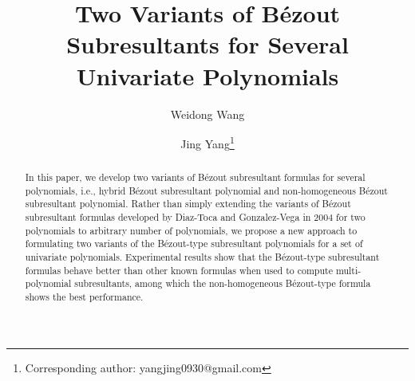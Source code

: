 \documentclass{article}
\begin{document}
\title{Two Variants of B\'ezout Subresultants for Several Univariate Polynomials }
\author{Weidong Wang}
\author{Jing Yang\thanks{Corresponding author: yangjing0930@gmail.com}}%



\date{}

\maketitle
\begin{abstract}In this paper, we develop two variants of B\'ezout subresultant formulas for several polynomials, i.e., hybrid B\'ezout subresultant polynomial and non-homogeneous B\'ezout subresultant polynomial. Rather than simply extending the variants of B\'ezout subresultant formulas developed by Diaz-Toca and Gonzalez-Vega in 2004 for two polynomials to arbitrary number of polynomials, we propose a new approach to formulating two variants of the B\'ezout-type subresultant polynomials for a set of univariate polynomials. Experimental results show that the B\'ezout-type subresultant formulas behave better than other known formulas when used to compute multi-polynomial subresultants, among which the non-homogeneous B\'ezout-type formula shows the best performance.
\end{abstract}
\end{document}
